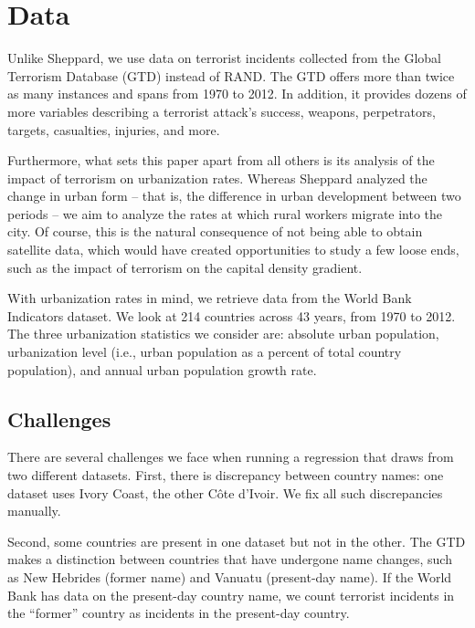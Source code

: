 \documentclass[preprint,2p,12pt]{elsarticle}
\begin{document}
\section{\sc Data}
Unlike Sheppard, we use data on terrorist incidents collected from the Global Terrorism Database (GTD) instead of RAND. The GTD offers more than twice as many instances and spans from 1970 to 2012. In addition, it provides dozens of more variables describing a terrorist attack's success, weapons, perpetrators, targets, casualties, injuries, and more.

Furthermore, what sets this paper apart from all others is its analysis of the impact of terrorism on urbanization rates. Whereas Sheppard analyzed the change in urban form -- that is, the difference in urban development between two periods -- we aim to analyze the rates at which rural workers migrate into the city. Of course, this is the natural consequence of not being able to obtain satellite data, which would have created opportunities to study a few loose ends, such as the impact of terrorism on the capital density gradient. 

With urbanization rates in mind, we retrieve data from the World Bank Indicators dataset. We look at 214 countries across 43 years, from 1970 to 2012.
The three urbanization statistics we consider are: absolute urban population, urbanization level (i.e., urban population as a percent of total country population), and annual urban population growth rate.

\subsection{Challenges}
There are several challenges we face when running a regression that draws from two different datasets.
First, there is discrepancy between country names: one dataset uses Ivory Coast, the other C\^{o}te d'Ivoir.
We fix all such discrepancies manually.

Second, some countries are present in one dataset but not in the other. 
The GTD makes a distinction between countries that have undergone name changes, such as New Hebrides (former name) and Vanuatu (present-day name).
If the World Bank has data on the present-day country name, we count terrorist incidents in the ``former'' country as incidents in the present-day country.
\end{document}
